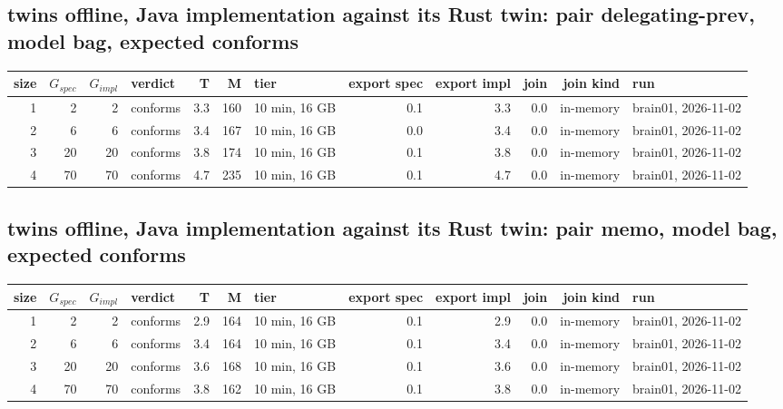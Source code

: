 \documentclass[10pt]{article}
\begin{document}
\subsection*{twins offline, Java implementation against its Rust twin: pair \textsf{delegating-prev}, model bag, expected conforms}
\begin{longtable}{@{}rrrlrrlrrrrl@{}}
\toprule
size & $G_{\mathit{spec}}$ & $G_{\mathit{impl}}$ & verdict & T & M & tier & export spec & export impl & join & join kind & run \\
\midrule
\endhead
\color{red} 1 & 2 & 2 & conforms & 3.3 & 160 & 10 min, 16 GB & 0.1 & 3.3 & 0.0 & in-memory & brain01, 2026-11-02 \\
\color{red} 2 & 6 & 6 & conforms & 3.4 & 167 & 10 min, 16 GB & 0.0 & 3.4 & 0.0 & in-memory & brain01, 2026-11-02 \\
\color{red} 3 & 20 & 20 & conforms & 3.8 & 174 & 10 min, 16 GB & 0.1 & 3.8 & 0.0 & in-memory & brain01, 2026-11-02 \\
\color{red} 4 & 70 & 70 & conforms & 4.7 & 235 & 10 min, 16 GB & 0.1 & 4.7 & 0.0 & in-memory & brain01, 2026-11-02 \\
\bottomrule
\end{longtable}
\subsection*{twins offline, Java implementation against its Rust twin: pair \textsf{memo}, model bag, expected conforms}
\begin{longtable}{@{}rrrlrrlrrrrl@{}}
\toprule
size & $G_{\mathit{spec}}$ & $G_{\mathit{impl}}$ & verdict & T & M & tier & export spec & export impl & join & join kind & run \\
\midrule
\endhead
\color{red} 1 & 2 & 2 & conforms & 2.9 & 164 & 10 min, 16 GB & 0.1 & 2.9 & 0.0 & in-memory & brain01, 2026-11-02 \\
\color{red} 2 & 6 & 6 & conforms & 3.4 & 164 & 10 min, 16 GB & 0.1 & 3.4 & 0.0 & in-memory & brain01, 2026-11-02 \\
\color{red} 3 & 20 & 20 & conforms & 3.6 & 168 & 10 min, 16 GB & 0.1 & 3.6 & 0.0 & in-memory & brain01, 2026-11-02 \\
\color{red} 4 & 70 & 70 & conforms & 3.8 & 162 & 10 min, 16 GB & 0.1 & 3.8 & 0.0 & in-memory & brain01, 2026-11-02 \\
\bottomrule
\end{longtable}
\end{document}
